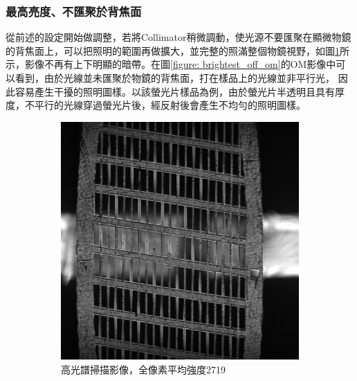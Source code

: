 \documentclass[12pt]{article}
\begin{document}
\subsubsection{最高亮度、不匯聚於背焦面}
從前述的設定開始做調整，若將Collimator稍微調動，使光源不要匯聚在顯微物鏡的背焦面上，可以把照明的範圍再做擴大，並完整的照滿整個物鏡視野，如圖\ref{figure: brightest_off}所示，影像不再有上下明顯的暗帶。在圖\ref{figure: brightest_off_om}的OM影像中可以看到，由於光線並未匯聚於物鏡的背焦面，打在樣品上的光線並非平行光，
因此容易產生干擾的照明圖樣。以該螢光片樣品為例，由於螢光片半透明且具有厚度，不平行的光線穿過螢光片後，經反射後會產生不均勻的照明圖樣。
\begin{figure}
    \centering
    \begin{subfigure}[t]{0.45\textwidth}
        \centering
        \includegraphics[width=\linewidth]{off_brightest.jpg}
        \caption{高光譜掃描影像，全像素平均強度2719}
        \label{figure: brightest_off}
    \end{subfigure}
    \begin{subfigure}[t]{0.45\textwidth}
        \centering

\end{subfigure}
\end{figure}
\end{document}
